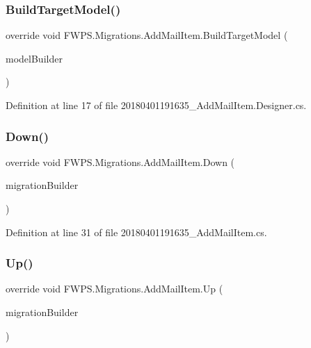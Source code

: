 \subsubsection{\texorpdfstring{Build\+Target\+Model()}{BuildTargetModel()}}
{\footnotesize\ttfamily override void F\+W\+P\+S.\+Migrations.\+Add\+Mail\+Item.\+Build\+Target\+Model (\begin{DoxyParamCaption}\item[{Model\+Builder}]{model\+Builder }\end{DoxyParamCaption})\hspace{0.3cm}{\ttfamily [protected]}}



Definition at line 17 of file 20180401191635\+\_\+\+Add\+Mail\+Item.\+Designer.\+cs.

\mbox{\label{class_f_w_p_s_1_1_migrations_1_1_add_mail_item_a83b780870d61f33cdfc828573c4808f2}} 
\subsubsection{\texorpdfstring{Down()}{Down()}}
{\footnotesize\ttfamily override void F\+W\+P\+S.\+Migrations.\+Add\+Mail\+Item.\+Down (\begin{DoxyParamCaption}\item[{Migration\+Builder}]{migration\+Builder }\end{DoxyParamCaption})\hspace{0.3cm}{\ttfamily [protected]}}



Definition at line 31 of file 20180401191635\+\_\+\+Add\+Mail\+Item.\+cs.

\mbox{\label{class_f_w_p_s_1_1_migrations_1_1_add_mail_item_aebbde7d1fb78bf46bd302eaf91ae1989}} 
\subsubsection{\texorpdfstring{Up()}{Up()}}
{\footnotesize\ttfamily override void F\+W\+P\+S.\+Migrations.\+Add\+Mail\+Item.\+Up (\begin{DoxyParamCaption}\item[{Migration\+Builder}]{migration\+Builder }\end{DoxyParamCaption})\hspace{0.3cm}{\ttfamily [protected]}}



